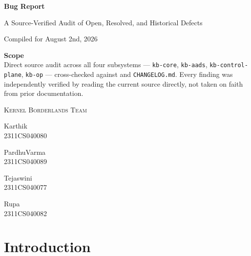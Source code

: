 \documentclass[11pt,a4paper]{article}
\newcommand{\devcredit}[2]{%
  \begin{minipage}[t]{3.2cm}
    \centering
    {\small #1}\\[0.35em]
    {\color{gray!65}\fontfamily{pzc}\selectfont\large #2}
  \end{minipage}%
}
\begin{document}
\begin{titlepage}
\thispagestyle{empty}
\centering
\vspace*{\fill}

{\small{}}

\vspace{1.6cm}

{\fontsize{40}{48}\selectfont\bfseries Bug Report}

\vspace{0.8em}

{\normalsize A Source-Verified Audit of Open, Resolved, and Historical Defects}

\vspace{1.2cm}

{\small Compiled for August 2nd, 2026}

\vspace*{\fill}

\begin{minipage}{0.8\linewidth}
\centering
\small
\textbf{Scope} \\[0.3em]
Direct source audit across all four subsystems --- \texttt{kb-core},
\texttt{kb-aads}, \texttt{kb-control-plane}, \texttt{kb-op} --- cross-checked
against  and
\texttt{CHANGELOG.md}. Every finding was independently verified by reading
the current source directly, not taken on faith from prior documentation.
\end{minipage}

\vspace{1.4cm}

{\small \scshape Kernel Borderlands Team}\\[0.9em]
\devcredit{Karthik}{2311CS040080}\hspace{0.6cm}\devcredit{PardhuVarma}{2311CS040089}\hspace{0.6cm}\devcredit{Tejaswini}{2311CS040077}\hspace{0.6cm}\devcredit{Rupa}{2311CS040082}

\vspace{1.5cm}
\end{titlepage}

\tableofcontents
\thispagestyle{plain}
\clearpage

\section*{Introduction}
\end{document}
